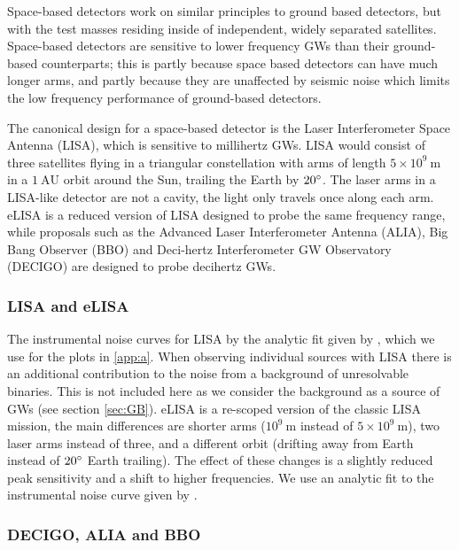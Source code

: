 Space-based detectors work on similar principles to ground based detectors, but with the test masses residing inside of independent, widely separated satellites. Space-based detectors are sensitive to lower frequency GWs than their ground-based counterparts; this is partly because space based detectors can have much longer arms, and partly because they are unaffected by seismic noise which limits the low frequency performance of ground-based detectors. 

The canonical design for a space-based detector is the Laser Interferometer Space Antenna (LISA), which is sensitive to millihertz GWs. LISA would consist of three satellites flying in a triangular constellation with arms of length $5\times 10^{9}~\mathrm{m}$ in a $1~\mathrm{AU}$ orbit around the Sun, trailing the Earth by $20^\circ$. The laser arms in a LISA-like detector are not a cavity, the light only travels once along each arm. eLISA is a reduced version of LISA designed to probe the same frequency range, while proposals such as the Advanced Laser Interferometer Antenna (ALIA), Big Bang Observer (BBO) and Deci-hertz Interferometer GW Observatory (DECIGO) are designed to probe decihertz GWs.

\subsubsection{LISA and eLISA}

The instrumental noise curves for LISA by the analytic fit given by \citet{Sathyaprakash}, which we use for the plots in \ref{app:a}. When observing individual sources with LISA there is an additional contribution to the noise from a background of unresolvable binaries. This is not included here as we consider the background as a source of GWs (see section \ref{sec:GB}). eLISA is a re-scoped version of the classic LISA mission, the main differences are shorter arms ($10^{9}~\mathrm{m}$ instead of $5\times 10^{9}~\mathrm{m}$), two laser arms instead of three, and a different orbit (drifting away from Earth instead of $20^\circ$ Earth trailing). The effect of these changes is a slightly reduced peak sensitivity and a shift to higher frequencies. We use an analytic fit to the instrumental noise curve given by \citet{Amaro-Seoane-et-al}.

\subsubsection{DECIGO, ALIA and BBO}

